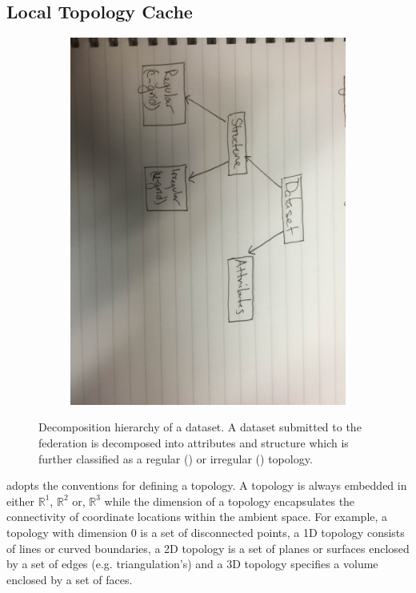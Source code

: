 \subsection{Local Topology Cache}
\begin{figure}[ht!]
  \centering
  \begin{subfigure}[t]{0.45\textwidth}
    \includegraphics[width=\textwidth]{../figs/data_hierarchy_rough}
  \end{subfigure}
  \caption{Decomposition hierarchy of a dataset. A dataset submitted
    to the federation is decomposed into attributes and structure
    which is further classified as a regular (\cgrid{}) or irregular
    (\ugrid{}) topology.}
  \label{fig:data_hierarchy}
\end{figure}

\sciwms{} adopts the \cfugrid{} conventions for defining a topology. A
topology is always embedded in either $\mathbb{R}^1$, $\mathbb{R}^2$
or, $\mathbb{R}^3$ while the dimension of a topology encapsulates the
connectivity of coordinate locations within the ambient space. For example, a
topology with dimension 0 is a set of disconnected points, a 1D
topology consists of lines or curved boundaries, a 2D topology is a
set of planes or surfaces enclosed by a set of edges
(e.g. triangulation's) and a 3D topology specifies a volume enclosed
by a set of faces.

